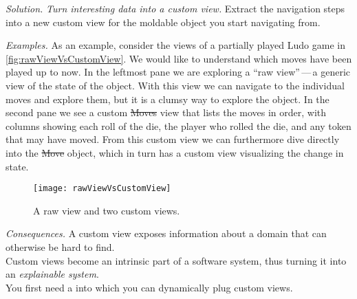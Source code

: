 \documentclass[acmsmall,screen,authorversion,nonacm]{acmart} %
\newcommand\eog[1]{\nbc{Edward}{#1}{purple}}
\newcommand\cp[1]{\nbe{Cesare}{#1}{olive}} %
\newcommand\ws[1]{\nbe{Workshop}{#1}{teal}} %
\newcommand{\patref}[1]{\emph{\nameref{pat:#1}}\xspace}
\newcommand{\patsec}[1]{\noindent\textit{#1.}\xspace}
\begin{document}

\patsec{Solution}
\emph{Turn interesting data into a custom view.}
Extract the navigation steps into a new custom view for the moldable object you start navigating from.


\patsec{Examples}
As an example, consider the views of a partially played Ludo game in \autoref{fig:rawViewVsCustomView}.
We would like to understand which moves have been played up to now.
In the leftmost pane we are exploring a ``raw view''\,---\,a generic view of the state of the object.
With this view we can navigate to the individual moves and explore them, but it is a clumsy way to explore the object.
In the second pane we see a custom \st{Moves} view that lists the moves in order, with columns showing each roll of the die, the player who rolled the die, and any token that may have moved.
From this custom view we can furthermore dive directly into the \st{Move} object, which in turn has a custom view visualizing the change in state.

\begin{figure}[h]
  \texttt{[image: rawViewVsCustomView]}
  \caption{A raw view and two custom views.}
  \label{fig:rawViewVsCustomView}
\end{figure}

\patsec{Consequences}
A custom view exposes information about a domain that can otherwise be hard to find.\\
Custom views become an intrinsic part of a software system,
thus turning it into an \emph{explainable system}.\\
You first need a \patref{MoldableTool} into which you can dynamically plug custom views.


\end{document}
